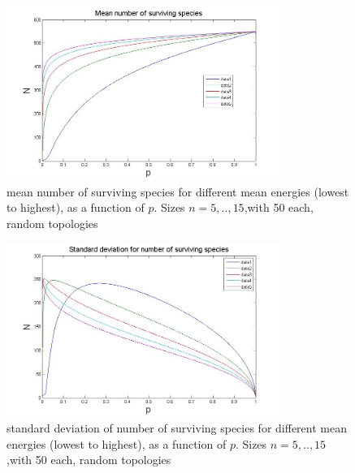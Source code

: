 \documentclass{amsart}
\theoremstyle{plain}
\numberwithin{equation}{section}
\begin{document}
\begin{figure}[p]
    \centering
    \includegraphics[width=0.8\textwidth]{means.jpg}
    \caption{mean number of surviving species for different mean energies (lowest to highest), as a function of $p$. Sizes $n=5,..,15$,with 50 each, random topologies }
    \label{fig11}
\end{figure}

\begin{figure}[p]
    \centering
    \includegraphics[width=0.8\textwidth]{std.jpg}
    \caption{standard deviation of number of surviving species for different mean energies (lowest to highest), as a function of $p$. Sizes $n=5,..,15$,with 50 each, random topologies}
    \label{fig12}
\end{figure}
\end{document}
